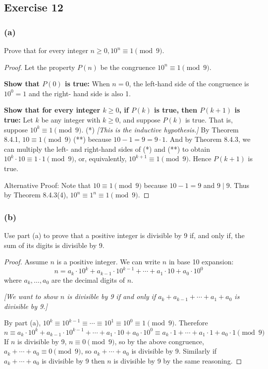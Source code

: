 \documentclass[14pt]{extarticle}
\begin{document}
\subsection{Exercise 12}
\subsubsection{(a)}
Prove that for every integer \(n \geq 0, 10^n \equiv 1 \pmod 9\).

\begin{proof}
        Let the property \(P(n)\) be the congruence \(10^n \equiv 1 \pmod 9\).

                {\bf Show that \(P(0)\) is true:} When \(n = 0\), the left-hand side of the congruence is \(10^0 = 1\) and the right-
        hand side is also 1.

                {\bf Show that for every integer \(k \geq 0\), if \(P(k)\) is true, then \(P(k + 1)\) is true:} Let \(k\) be any
        integer with \(k \geq 0\), and suppose \(P(k)\) is true. That is, suppose \(10^k \equiv 1 \pmod 9\). (*) {\it [This
                                is the inductive hypothesis.]} By Theorem 8.4.1, \(10 \equiv 1 \pmod 9\) (**) because \(10 - 1 = 9 = 9 \cdot 1\).
        And by Theorem 8.4.3, we can multiply the left- and right-hand sides of (*) and (**) to obtain \(10^k \cdot 10 \equiv
        1 \cdot 1 \pmod 9\), or, equivalently, \(10^{k+1} \equiv 1 \pmod 9\). Hence \(P(k + 1)\) is true.

        Alternative Proof: Note that \(10 \equiv 1 \pmod 9\) because \(10 - 1 = 9\) and \(9 \mid 9\). Thus by Theorem
        8.4.3(4), \(10^n \equiv 1^n \equiv 1 \pmod 9\).
\end{proof}

\subsubsection{(b)}
Use part (a) to prove that a positive integer is divisible by 9 if, and only if, the sum of its digits is divisible by 9.

\begin{proof}
        Assume \(n\) is a positive integer. We can write \(n\) in base 10 expansion:
        \[
                n = a_k \cdot 10^k + a_{k-1} \cdot 10^{k-1} + \cdots + a_1 \cdot 10 + a_0 \cdot 10^0
        \]
        where \(a_k, \ldots, a_0\) are the decimal digits of $n$.

                {\it [We want to show $n$ is divisible by 9 if and only if \(a_k + a_{k-1} + \cdots +a_1+ a_0\) is divisible by 9.]}

        By part (a), \(10^k \equiv 10^{k-1} \equiv \cdots \equiv 10^1 \equiv 10^0 \equiv 1 \pmod 9\). Therefore
        \[
                n \equiv a_k \cdot 10^k + a_{k-1} \cdot 10^{k-1} + \cdots + a_1 \cdot 10 + a_0 \cdot 10^0 \equiv a_k \cdot 1 + \cdots +
                a_1 \cdot 1 + a_0 \cdot 1 \pmod 9
        \]
        If \(n\) is divisible by 9, \(n \equiv 0 \pmod 9\), so by the above congruence, \(a_k +\cdots+a_0 \equiv 0 \pmod 9\),
        so \(a_k + \cdots + a_0\) is divisible by 9. Similarly if \(a_k + \cdots + a_0\) is divisible by 9 then $n$ is
        divisible by 9 by the same reasoning.
\end{proof}
\end{document}
